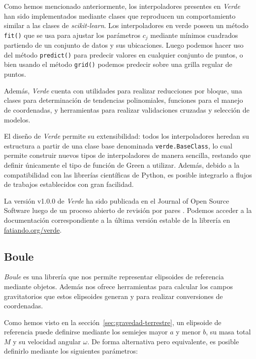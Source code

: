 Como hemos mencionado anteriormente, los interpoladores presentes en
\emph{Verde} han sido implementados mediante clases que reproducen un
comportamiento similar a las clases de \emph{scikit-learn}.
Los interpoladores en verde poseen un método \texttt{fit()} que se usa para
ajustar los parámetros $c_j$ mediante mínimos cuadrados partiendo de un
conjunto de datos y sus ubicaciones. Luego podemos hacer uso del método
\texttt{predict()} para predecir valores en cualquier conjunto de puntos,
o bien usando el método \texttt{grid()} podemos predecir sobre una grilla
regular de puntos.

Además, \emph{Verde} cuenta con utilidades para realizar reducciones por
bloque, una clases para determinación de tendencias polinomiales, funciones
para el manejo de coordenadas, y herramientas para realizar validaciones
cruzadas y selección de modelos.

El diseño de \emph{Verde} permite su extensibilidad: todos los interpoladores
heredan su estructura a partir de una clase base denominada
\texttt{verde.BaseClass}, lo cual permite construir nuevos tipos de
interpoladores de manera sencilla, restando que definir únicamente el tipo de
función de Green a utilizar.
Además, debido a la compatibilidad con las librerías científicas de Python, es
posible integrarlo a flujos de trabajos establecidos con gran facilidad.

La versión v1.0.0 de \emph{Verde} ha sido publicada en el Journal of Open
Source Software luego de un proceso abierto de revisión por pares
\citep{verde2018}.
Podemos acceder a la documentación correspondiente a la última versión estable
de la librería en \href{https://www.fatiando.org/verde}{fatiando.org/verde}.


\subsection{Boule}

\emph{Boule} es una librería que nos permite representar elipsoides de
referencia mediante objetos. Además nos ofrece herramientas para calcular los
campos gravitatorios que estos elipsoides generan y para realizar conversiones
de coordenadas.

Como hemos visto en la sección~\ref{sec:gravedad-terrestre}, un elipsoide de
referencia puede definirse mediante los semiejes mayor $a$ y menor $b$, su masa
total $M$ y su velocidad angular $\omega$.
De forma alternativa pero equivalente, es posible definirlo mediante los
siguientes parámetros:

